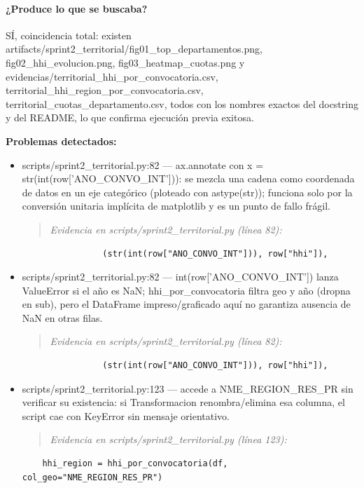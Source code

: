 \paragraph{¿Produce lo que se buscaba?}
SÍ, coincidencia total: existen artifacts/sprint2\_territorial/fig01\_top\_departamentos.png, fig02\_hhi\_evolucion.png, fig03\_heatmap\_cuotas.png y evidencias/territorial\_hhi\_por\_convocatoria.csv, territorial\_hhi\_region\_por\_convocatoria.csv, territorial\_cuotas\_departamento.csv, todos con los nombres exactos del docstring y del README, lo que confirma ejecución previa exitosa.

\begin{tcolorbox}[riesgo]
\textbf{Problemas detectados:}
\begin{itemize}
  \item scripts/sprint2\_territorial.py:82 --- ax.annotate con x = str(int(row['ANO\_CONVO\_INT'])): se mezcla una cadena como coordenada de datos en un eje categórico (ploteado con astype(str)); funciona solo por la conversión unitaria implícita de matplotlib y es un punto de fallo frágil.
\begin{quote}\footnotesize\ttfamily
\noindent\emph{Evidencia en scripts/sprint2\_territorial.py (línea 82):}
\end{quote}
\begin{lstlisting}
                (str(int(row["ANO_CONVO_INT"])), row["hhi"]),
\end{lstlisting}

  \item scripts/sprint2\_territorial.py:82 --- int(row['ANO\_CONVO\_INT']) lanza ValueError si el año es NaN; hhi\_por\_convocatoria filtra geo y año (dropna en sub), pero el DataFrame impreso/graficado aquí no garantiza ausencia de NaN en otras filas.
\begin{quote}\footnotesize\ttfamily
\noindent\emph{Evidencia en scripts/sprint2\_territorial.py (línea 82):}
\end{quote}
\begin{lstlisting}
                (str(int(row["ANO_CONVO_INT"])), row["hhi"]),
\end{lstlisting}

  \item scripts/sprint2\_territorial.py:123 --- accede a NME\_REGION\_RES\_PR sin verificar su existencia: si Transformacion renombra/elimina esa columna, el script cae con KeyError sin mensaje orientativo.
\begin{quote}\footnotesize\ttfamily
\noindent\emph{Evidencia en scripts/sprint2\_territorial.py (línea 123):}
\end{quote}
\begin{lstlisting}
    hhi_region = hhi_por_convocatoria(df, col_geo="NME_REGION_RES_PR")
\end{lstlisting}

\end{itemize}
\end{tcolorbox}


